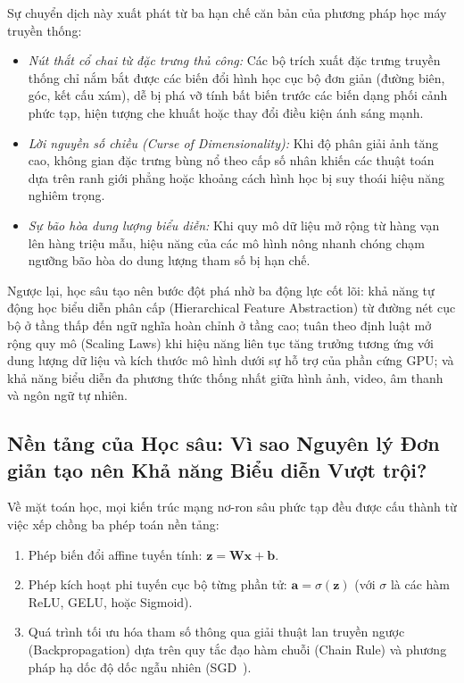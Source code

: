 Sự chuyển dịch này xuất phát từ ba hạn chế căn bản của phương pháp học máy truyền thống:
\begin{itemize}
    \item \textit{Nút thắt cổ chai từ đặc trưng thủ công:} Các bộ trích xuất đặc trưng truyền thống chỉ nắm bắt được các biến đổi hình học cục bộ đơn giản (đường biên, góc, kết cấu xám), dễ bị phá vỡ tính bất biến trước các biến dạng phối cảnh phức tạp, hiện tượng che khuất hoặc thay đổi điều kiện ánh sáng mạnh.
    \item \textit{Lời nguyền số chiều (Curse of Dimensionality):} Khi độ phân giải ảnh tăng cao, không gian đặc trưng bùng nổ theo cấp số nhân khiến các thuật toán dựa trên ranh giới phẳng hoặc khoảng cách hình học bị suy thoái hiệu năng nghiêm trọng.
    \item \textit{Sự bão hòa dung lượng biểu diễn:} Khi quy mô dữ liệu mở rộng từ hàng vạn lên hàng triệu mẫu, hiệu năng của các mô hình nông nhanh chóng chạm ngưỡng bão hòa do dung lượng tham số bị hạn chế.
\end{itemize}

Ngược lại, học sâu tạo nên bước đột phá nhờ ba động lực cốt lõi: khả năng tự động học biểu diễn phân cấp (Hierarchical Feature Abstraction) từ đường nét cục bộ ở tầng thấp đến ngữ nghĩa hoàn chỉnh ở tầng cao; tuân theo định luật mở rộng quy mô (Scaling Laws) khi hiệu năng liên tục tăng trưởng tương ứng với dung lượng dữ liệu và kích thước mô hình dưới sự hỗ trợ của phần cứng GPU; và khả năng biểu diễn đa phương thức thống nhất giữa hình ảnh, video, âm thanh và ngôn ngữ tự nhiên.

\subsection{Nền tảng của Học sâu: Vì sao Nguyên lý Đơn giản tạo nên Khả năng Biểu diễn Vượt trội?}

Về mặt toán học, mọi kiến trúc mạng nơ-ron sâu phức tạp đều được cấu thành từ việc xếp chồng ba phép toán nền tảng:
\begin{enumerate}
    \item Phép biến đổi affine tuyến tính: $\mathbf{z} = \mathbf{W}\mathbf{x} + \mathbf{b}$.
    \item Phép kích hoạt phi tuyến cục bộ từng phần tử: $\mathbf{a} = \sigma(\mathbf{z})$ (với $\sigma$ là các hàm ReLU, GELU, hoặc Sigmoid).
    \item Quá trình tối ưu hóa tham số thông qua giải thuật lan truyền ngược (Backpropagation) dựa trên quy tắc đạo hàm chuỗi (Chain Rule) và phương pháp hạ dốc độ dốc ngẫu nhiên (SGD~\citep{robbins1951stochastic}).
\end{enumerate}


